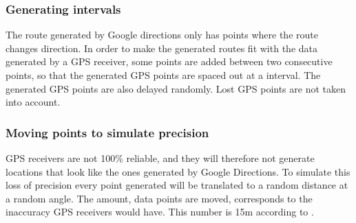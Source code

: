 \subsubsection{Generating intervals}
The route generated by Google directions only has points where the route changes direction.
In order to make the generated routes fit with the data generated by a GPS receiver, some points are added between two consecutive points, so that the generated GPS points are spaced out at a interval.
The generated GPS points are also delayed randomly.
Lost GPS points are not taken into account.

\subsubsection{Moving points to simulate precision}
GPS receivers are not 100\% reliable, and they will therefore not generate locations that look like the ones generated by Google Directions.
To simulate this loss of precision every point generated will be translated to a random distance at a random angle.
The amount, data points are moved, corresponds to the inaccuracy GPS receivers would have. This number is 15m according to \citet{garmingps}.